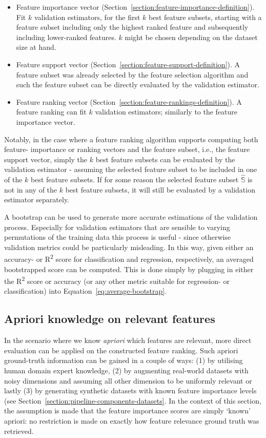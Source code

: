 \documentclass{article}
\begin{document}
\begin{itemize}
    \item Feature importance vector (Section~\ref{section:feature-importance-definition}). Fit $k$ validation estimators, for the first $k$ best feature subsets, starting with a feature subset including only the highest ranked feature and subsequently including lower-ranked features. $k$ might be chosen depending on the dataset size at hand.
    \item Feature support vector (Section~\ref{section:feature-support-definition}). A feature subset was already selected by the feature selection algorithm and such the feature subset can be directly evaluated by the validation estimator.
    \item Feature ranking vector (Section~\ref{section:feature-rankings-definition}). A feature ranking can fit $k$ validation estimators; similarly to the feature importance vector.
\end{itemize}

Notably, in the case where a feature ranking algorithm supports computing both feature- importance or ranking vectors and the feature subset, i.e., the feature support vector, simply the $k$ best feature subsets can be evaluated by the validation estimator - assuming the selected feature subset to be included in one of the $k$ best feature subsets. If for some reason the selected feature subset $\hat{\mathbb{S}}$ is not in any of the $k$ best feature subsets, it will still be evaluated by a validation estimator separately.

A bootstrap can be used to generate more accurate estimations of the validation process. Especially for validation estimators that are sensible to varying permutations of the training data this process is useful - since otherwise validation metrics could be particularly misleading. In this way, given either an accuracy- or R\textsuperscript{2} score for classification and regression, respectively, an averaged bootstrapped score can be computed. This is done simply by plugging in either the R\textsuperscript{2} score or accuracy (or any other metric suitable for regression- or classification) into Equation~\ref{eq:average-bootstrap}.

\subsection{Apriori knowledge on relevant features}
In the scenario where we know \textit{\gls{apriori}} which features are relevant, more direct evaluation can be applied on the constructed feature ranking. Such apriori ground-truth information can be gained in a couple of ways: (1) by utilising human domain expert knowledge, (2) by augmenting real-world datasets with noisy dimensions and assuming all other dimension to be uniformly relevant or lastly (3) by generating synthetic datasets with known feature importance levels (see Section~\ref{section:pipeline-components-datasets}. In the context of this section, the assumption is made that the feature importance scores are simply `known' apriori: no restriction is made on exactly how feature relevance ground truth was retrieved.
\end{document}
